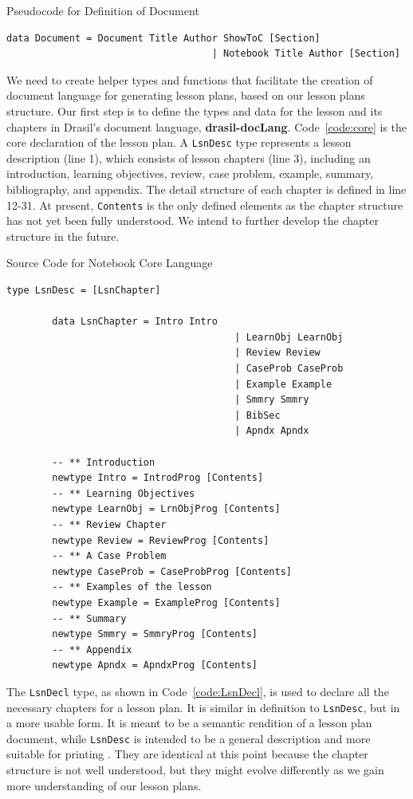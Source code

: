 \begin{listing}[h]
	\caption{Pseudocode for Definition of Document}
	\label{code:drasil-lang-document}
	\begin{lstlisting}[language=haskell1]
		data Document = Document Title Author ShowToC [Section]
									| Notebook Title Author [Section]
	\end{lstlisting}
\end{listing}

We need to create helper types and functions that facilitate the creation of 
document language for generating lesson plans, based on our lesson plans 
structure. Our first step is to define the types and data for the lesson and 
its chapters in Drasil's document language, \textbf{drasil-docLang}. 
Code~\ref{code:core} is the core declaration of the lesson plan. A 
\texttt{LsnDesc} type represents a lesson description (line 1), which consists 
of lesson chapters (line 3), including an introduction, learning objectives, 
review, case problem, example, summary, bibliography, and appendix. The detail 
structure of each chapter is defined in line 12-31. At present, 
\texttt{Contents} is the only defined elements as the chapter structure has not 
yet been fully understood. We intend to further develop the chapter structure 
in the future.

\begin{listing}[h!]
	\caption{Source Code for Notebook Core Language}
	\label{code:core}
	\begin{lstlisting}[language=haskell1]		
		type LsnDesc = [LsnChapter]

		data LsnChapter = Intro Intro
										| LearnObj LearnObj
										| Review Review
										| CaseProb CaseProb
										| Example Example
										| Smmry Smmry
										| BibSec
										| Apndx Apndx
		
		-- ** Introduction
		newtype Intro = IntrodProg [Contents]		
		-- ** Learning Objectives
		newtype LearnObj = LrnObjProg [Contents]		
		-- ** Review Chapter
		newtype Review = ReviewProg [Contents]		
		-- ** A Case Problem
		newtype CaseProb = CaseProbProg [Contents]		
		-- ** Examples of the lesson
		newtype Example = ExampleProg [Contents]		
		-- ** Summary
		newtype Smmry = SmmryProg [Contents]		
		-- ** Appendix
		newtype Apndx = ApndxProg [Contents]
	\end{lstlisting}
\end{listing}

The \texttt{LsnDecl} type, as shown in Code~\ref{code:LsnDecl}, is used to 
declare all the necessary chapters for a lesson plan. It is similar in 
definition to \texttt{LsnDesc}, but in a more usable form. It is meant to be a 
semantic rendition of a lesson plan document, while \texttt{LsnDesc} is 
intended to be a general description and more suitable for printing 
\cite{lsnDeclandlsnDesc}. They are identical at this point because the chapter 
structure is not well understood, but they might evolve differently as we gain 
more understanding of our lesson plans.

